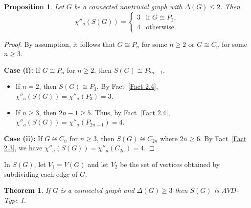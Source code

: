 \documentclass[12pt,reqno,a4paper]{amsart}
\theoremstyle{definition}
\theoremstyle{plain}
\newtheorem{thm}[defn]{Theorem}
\newtheorem{prop}[defn]{Proposition}
\begin{document}
\begin{prop}\label{Proposition 2.5}
Let $G$ be a connected nontrivial graph with $\Delta(G) \leq 2$. Then 
\[
\chi''_{a}(S(G)) = 
\begin{cases} 
3 & \text{if } G \cong P_2, \\ 
4 & \text{otherwise}. 
\end{cases}
\]
\end{prop}

\begin{proof}
By assumption, it follows that
$G\cong P_n$ for some $n\geq 2$ or $G\cong C_n$ for some $n\geq 3$. 

\textbf{Case (i):} If $G \cong P_n$ for $n\geq 2$, then $S(G) \cong P_{2n-1}$. 
\begin{itemize}
    \item If $n=2$, then $S(G) \cong P_3$. By Fact~\ref{Fact 2.4}, $\chi''_{a}(S(G))=\chi''_{a}(P_3) = 3$.
    \item If $n \geq 3$, then $2n-1 \geq 5$. Thus, by Fact~\ref{Fact 2.4}, $\chi''_{a}(S(G))=\chi''_{a}(P_{2n-1}) = 4$.
\end{itemize}

\textbf{Case (ii):} If $G \cong C_n$ for $n \geq 3$, then $S(G) \cong C_{2n}$ where $2n \geq 6$. By Fact~\ref{Fact 2.3}, we have $\chi''_{a}(S(G))=\chi''_{a}(C_{2n}) = 4$.
\end{proof}

In $S(G)$, let $V_1=V(G)$ and let $V_2$ be the set of vertices obtained by subdividing each edge of $G$.

\begin{thm}\label{Theorem 2.6}
If $G$ is a connected graph and $\Delta(G)\geq 3$ then $S(G)$ is $AVD$-Type 1.
\end{thm}
\end{document}

